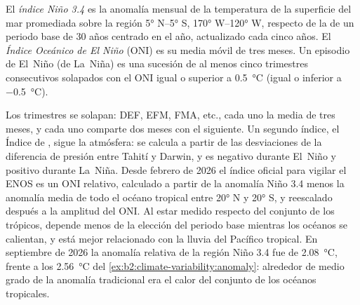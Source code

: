 \begin{definition}\label{def:b2:climate-variability:oni}
El \emph{índice Niño 3.4} es la anomalía mensual de la temperatura de la superficie del mar
promediada sobre la región \ang{5} N--\ang{5} S, \ang{170} W--\ang{120} W, respecto de
la  de un periodo base de 30 años centrado en el año, actualizado cada cinco años. El
\emph{Índice Oceánico de El Niño} (ONI) es su media móvil de tres meses. Un
episodio de El~Niño (de La~Niña) es una sucesión de al menos cinco trimestres consecutivos solapados
con el ONI igual o superior a \qty{+0.5}{\celsius} (igual o inferior a \qty{-0.5}{\celsius}).
\end{definition}

Los trimestres se solapan: DEF, EFM, FMA, etc., cada uno la media de tres meses, y cada uno comparte dos
meses con el siguiente. Un segundo índice, el Índice de , sigue la atmósfera: se
calcula a partir de las desviaciones de la diferencia de presión entre Tahití y Darwin, y es negativo
durante El~Niño y positivo durante La~Niña. Desde febrero de 2026 el índice oficial para vigilar el
ENOS es un ONI relativo, calculado a partir de la anomalía Niño 3.4 menos la anomalía media de todo el
océano tropical entre \ang{20} N y \ang{20} S, y reescalado después a la amplitud del ONI. Al estar
medido respecto del conjunto de los trópicos, depende menos de la elección del periodo base mientras los océanos
se calientan, y está mejor relacionado con la lluvia del Pacífico tropical. En septiembre de 2026 la
anomalía relativa de la región Niño 3.4 fue de \qty{2.08}{\celsius}, frente a los \qty{2.56}{\celsius}
del \cref{ex:b2:climate-variability:anomaly}: alrededor de medio grado de la anomalía tradicional era el
calor del conjunto de los océanos tropicales.

